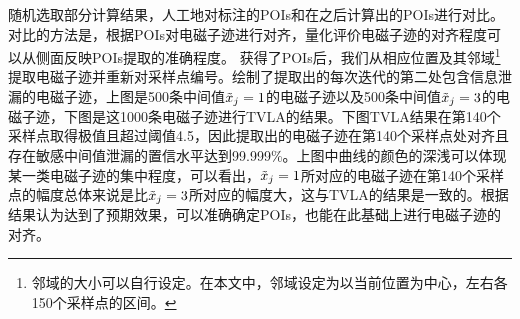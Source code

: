 {{{	%
}

	随机选取部分计算结果，人工地对标注的POIs和在\yuchuli 之后计算出的POIs进行对比。对比的方法是，根据POIs对电磁子迹进行对齐，量化评价电磁子迹的对齐程度可以从侧面反映POIs提取的准确程度。
	获得了POIs后，我们从相应位置及其邻域\footnote{邻域的大小可以自行设定。在本文中，邻域设定为以当前位置为中心，左右各150个采样点的区间。}提取电磁子迹并重新对采样点编号。绘制了提取出的每次迭代的第二处包含信息泄漏的电磁子迹，上图是500条中间值$\tilde{x}_j=1$的电磁子迹以及500条中间值$\tilde{x}_j=3$的电磁子迹，下图是这1000条电磁子迹进行TVLA的结果。下图TVLA结果在第140个采样点取得极值且超过阈值4.5，因此提取出的电磁子迹在第140个采样点处对齐且存在敏感中间值泄漏的置信水平达到99.999\%。上图中曲线的颜色的深浅可以体现某一类电磁子迹的集中程度，可以看出，$\tilde{x}_j=1$所对应的电磁子迹在第140个采样点的幅度总体来说是比$\tilde{x}_j=3$所对应的幅度大，这与TVLA的结果是一致的。根据结果认为\yuchuli 达到了预期效果，可以准确确定POIs，也能在此基础上进行电磁子迹的对齐。
	
}}
